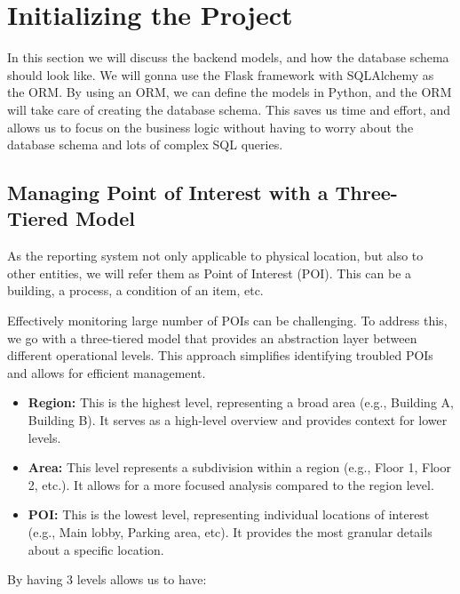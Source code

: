 
\section{Initializing the Project}
\label{sec:internship_experience:initializing_project}

In this section we will discuss the backend models, and how the database schema should look like. We will gonna use the Flask framework with SQLAlchemy as the ORM\@. By using an ORM, we can define the models in Python, and the ORM will take care of creating the database schema. This saves us time and effort, and allows us to focus on the business logic without having to worry about the database schema and lots of complex SQL queries.

\subsection{Managing Point of Interest with a Three-Tiered Model}
\label{subsec:internship_experience:three_tiered_model}

As the reporting system not only applicable to physical location, but also to other entities, we will refer them as Point of Interest (POI). This can be a building, a process, a condition of an item, etc. 

Effectively monitoring large number of POIs can be challenging. To address this, we go with a three-tiered model that provides an abstraction layer between different operational levels. This approach simplifies identifying troubled POIs and allows for efficient management.

\begin{itemize}
    \item \textbf{Region:} This is the highest level, representing a broad area (e.g., Building A, Building B). It serves as a high-level overview and provides context for lower levels.
    \item \textbf{Area:} This level represents a subdivision within a region (e.g., Floor 1, Floor 2, etc.). It allows for a more focused analysis compared to the region level.
    \item \textbf{POI:} This is the lowest level, representing individual locations of interest (e.g., Main lobby, Parking area, etc). It provides the most granular details about a specific location.
\end{itemize}

By having 3 levels allows us to have:

